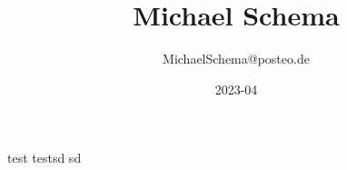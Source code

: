 \documentclass[11pt]{article}
\title{\bfseries\Huge Michael Schema}
\author{MichaelSchema@posteo.de}
\date{2023-04}
\begin{document}
    \maketitle

test
testsd \n
sd
\end{document}
